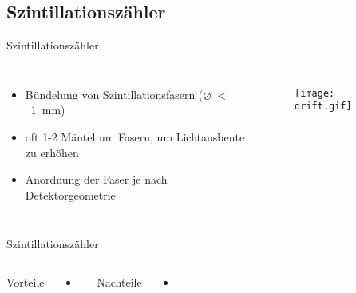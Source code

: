 	
\subsection[]{Szintillationszähler}



\begin{frame}{Szintillationszähler}
	\begin{columns}[T]
			\begin{itemize}
			  \item Bündelung von Szintillationsfasern ($\varnothing~<$~1~mm)
			  \item oft 1-2 Mäntel um Fasern, um Lichtausbeute zu erhöhen
			  \item Anordnung der Faser je nach Detektorgeometrie
			\end{itemize}	
	    	\begin{figure}[htbp]
			  \centering
			  \texttt{[image: drift.gif]}
			\end{figure}
    \end{columns}
\end{frame}	
	
	\begin{frame}{Szintillationszähler}
    \begin{columns}[T]
			Vorteile		
			\vspace{0.7cm}
			\begin{itemize}
			  \item 
			\end{itemize}	
	    	Nachteile
	    	\vspace{0.7cm}
	    	\begin{itemize}
			  \item 
			\end{itemize}
    \end{columns}
\end{frame}